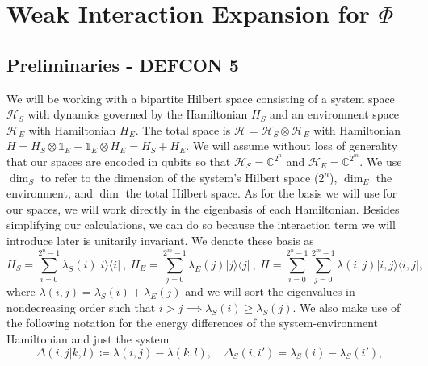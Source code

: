 \documentclass{article}
\newcommand{\ketbra}[2]{| #1\rangle\! \langle #2|}
\newcommand{\hilb}{\mathcal{H}}
\newcommand{\identity}{\mathds{1}}
\begin{document}


\section{Weak Interaction Expansion for $\Phi$} \label{sec:weak_coupling}
\subsection{Preliminaries - DEFCON 5} \label{sec:prelim}
We will be working with a bipartite Hilbert space consisting of a system space $\hilb_S$ with dynamics governed by the Hamiltonian $H_S$ and an environment space $\hilb_E$ with Hamiltonian $H_E$. The total space is $\hilb = \hilb_S \otimes \hilb_E$ with Hamiltonian $H = H_S \otimes \identity_E + \identity_E \otimes H_E = H_S + H_E$. We will assume without loss of generality that our spaces are encoded in qubits so that $\hilb_S = \mathbb{C}^{2^n}$ and $\hilb_E = \mathbb{C}^{2^m}$. We use $\dim_S$ to refer to the dimension of the system's Hilbert space ($2^n$), $\dim_E$ the environment, and $\dim$ the total Hilbert space. As for the basis we will use for our spaces, we will work directly in the eigenbasis of each Hamiltonian. Besides simplifying our calculations, we can do so because the interaction term we will introduce later is unitarily invariant. We denote these basis as
\begin{equation}
    H_{S} = \sum_{i = 0}^{2^n - 1} \lambda_S(i) \ketbra{i}{i} ~,~ H_{E} = \sum_{j=0}^{2^m - 1} \lambda_E(j) \ketbra{j}{j} ~,~ H = \sum_{i=0}^{2^n - 1} \sum_{j=0}^{2^m - 1} \lambda(i,j) \ketbra{i,j}{i,j},
\end{equation}
where $\lambda(i,j) = \lambda_S(i) + \lambda_E(j)$ and we will sort the eigenvalues in nondecreasing order such that $i > j \implies \lambda_S(i) \geq \lambda_S(j)$. We also make use of the following notation for the energy differences of the system-environment Hamiltonian and just the system
\begin{equation}
\Delta(i,j|k,l) \coloneqq \lambda(i,j) - \lambda(k,l), \quad \Delta_S(i,i') = \lambda_S(i) - \lambda_S(i'), \label{eq:delta_def}
\end{equation}
\end{document}
